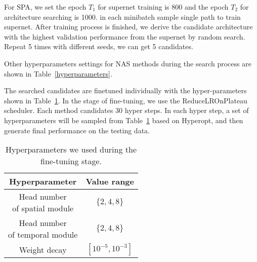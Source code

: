 \documentclass[11pt]{article}
\begin{document}
For SPA, 
we set the epoch $T_1$ for supernet training is 800 and the epoch $T_2$ for architecture searching is 1000.
in each minibatch sample single path to train supernet. 
After training process is finished, 
we derive the candidate architecture with the highest validation performance from the supernet by random search. 
Repeat 5 times with different seeds, we can get 5 candidates.

Other hyperparameters settings for NAS methods during the search process are shown in Table~\ref{hyperparameters}.

The searched candidates are finetuned individually with the hyper-parameters shown in Table~\ref{tab-hyper-finetune}. 
In the stage of fine-tuning, 
we use the ReduceLROnPlateau scheduler.
Each method candidates 30 hyper steps. 
In each hyper step, a set of hyperparameters will be sampled from Table~\ref{tab-hyper-finetune} based on Hyperopt, and then generate final performance on the testing data. 

\begin{table}[hp]
	\centering
\begin{tabular}{cc}
		\toprule
		\textbf{Hyperparameter} & \textbf{Value range}              \\ 
		\midrule
		\makecell{Head number \\of spatial module}  &  $\{2,4,8\}$                             \\ 
		\midrule
		\makecell{Head number \\of temporal module}  &        $\{2,4,8\}$                         \\ 
		\midrule
		Weight decay   &           $[10^{-5},10^{-3}]$         \\ 
		\bottomrule
	\end{tabular}
	\caption{Hyperparameters we used during the fine-tuning stage.}
	\label{tab-hyper-finetune}
\end{table}
\end{document}
